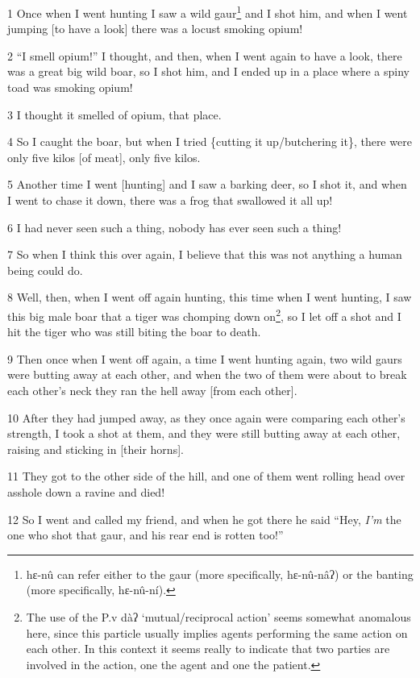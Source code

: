
1 Once when I went hunting I saw a wild gaur\footnote{hɛ-nû can refer either to the gaur (more specifically, hɛ-nû-nâʔ) or the banting (more specifically, hɛ-nû-ní).} and I shot him, and when I went
jumping [to have a look] there was a locust smoking opium!

2 ``I smell opium!'' I thought, and then, when I went again to have a look, there
was a great big wild boar, so I shot him, and I ended up in a place where a spiny
toad was smoking opium!

3 I thought it smelled of opium, that place.

4 So I caught the boar, but when I tried \{cutting it up/butchering it\}, there
were only five kilos [of meat], only five kilos.

5 Another time I went [hunting] and I saw a barking deer, so I shot it, and when
I went to chase it down, there was a frog that swallowed it all up!

6 I had never seen such a thing, nobody has ever seen such a thing!

7 So when I think this over again, I believe that this was not anything a human
being could do.

8 Well, then, when I went off again hunting, this time when I went hunting, I saw
this big male boar that a tiger was chomping down on\footnote{The use of the P.v dàʔ `mutual/reciprocal action' seems somewhat anomalous here, since this particle usually implies agents performing the same action on each other. In this context it seems really to indicate that two parties are involved in the action, one the agent and one the patient.}, so I let off a shot and
I hit the tiger who was still biting the boar to death.

9 Then once when I went off again, a time I went hunting again, two wild gaurs
were butting away at each other, and when the two of them were about to break each
other's neck they ran the hell away [from each other].

10 After they had jumped away, as they once again were comparing each other's strength,
I took a shot at them, and they were still butting away at each other, raising
and sticking in [their horns].

11 They got to the other side of the hill, and one of them went rolling head over
asshole down a ravine and died!

12 So I went and called my friend, and when he got there he said ``Hey, \textit{I'm}
the one who shot that gaur, and his rear end is rotten too!''

